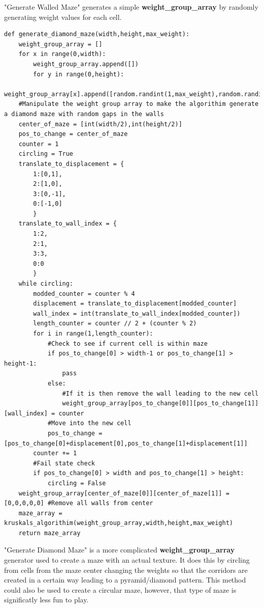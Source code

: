 \documentclass{article}
\begin{document}
"Generate Walled Maze" generates a simple \textbf{weight\_group\_array} by randomly generating weight values for each cell.
\clearpage
\begin{lstlisting}
def generate_diamond_maze(width,height,max_weight):
    weight_group_array = []
    for x in range(0,width):
        weight_group_array.append([])
        for y in range(0,height):
            weight_group_array[x].append([random.randint(1,max_weight),random.randint(1,max_weight),random.randint(1,max_weight),random.randint(1,max_weight),0])
    #Manipulate the weight group array to make the algorithim generate a diamond maze with random gaps in the walls
    center_of_maze = [int(width/2),int(height/2)]
    pos_to_change = center_of_maze
    counter = 1
    circling = True
    translate_to_displacement = {
        1:[0,1],
        2:[1,0],
        3:[0,-1],
        0:[-1,0]
        }
    translate_to_wall_index = {
        1:2,
        2:1,
        3:3,
        0:0
        }
    while circling:
        modded_counter = counter % 4
        displacement = translate_to_displacement[modded_counter]
        wall_index = int(translate_to_wall_index[modded_counter])
        length_counter = counter // 2 + (counter % 2)
        for i in range(1,length_counter):
            #Check to see if current cell is within maze
            if pos_to_change[0] > width-1 or pos_to_change[1] > height-1:
                pass
            else:
                #If it is then remove the wall leading to the new cell
                weight_group_array[pos_to_change[0]][pos_to_change[1]][wall_index] = counter
            #Move into the new cell
            pos_to_change = [pos_to_change[0]+displacement[0],pos_to_change[1]+displacement[1]]
        counter += 1
        #Fail state check
        if pos_to_change[0] > width and pos_to_change[1] > height:
            circling = False
    weight_group_array[center_of_maze[0]][center_of_maze[1]] = [0,0,0,0,0] #Remove all walls from center
    maze_array = kruskals_algorithim(weight_group_array,width,height,max_weight)
    return maze_array 
\end{lstlisting}
"Generate Diamond Maze" is a more complicated  \textbf{weight\_group\_array} generator used to create a maze with an actual texture. It does this by
circling from cells from the maze center changing the weights so that the corridors are created in a certain way leading to a pyramid/diamond pattern. This method
could also be used to create a circular maze, however, that type of maze is significatly less fun to play. 
\end{document}
